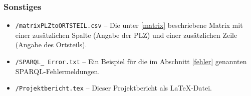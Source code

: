 \documentclass[a4paper,11pt]{article}
\begin{document}
\subsubsection{Sonstiges}

\begin{itemize}
\setlength{\itemsep}{-2pt}
\item \texttt{/matrixPLZtoORTSTEIL.csv} -- Die unter \ref{matrix} beschriebene
  Matrix mit einer zusätzlichen Spalte (Angabe der PLZ) und einer zusätzlichen
  Zeile (Angabe des Ortsteils).
\item \texttt{/SPARQL\_ Error.txt} -- Ein Beispiel für die im Abschnitt
  \ref{fehler} genannten SPARQL-Fehler\-meldungen.
\item \texttt{/Projektbericht.tex} -- Dieser Projektbericht als \LaTeX-Datei.
\end{itemize}
\end{document}
